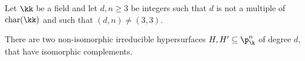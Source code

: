 \begin{maintheorem}\label{34and43}
Let $\kk$ be a field and let $d,n \ge 3$ be integers such that $d$ is not a multiple of $\mathrm{char}(\kk)$ and such that $(d,n)\neq (3,3)$.

There are two non-isomorphic irreducible hypersurfaces $H,H'\subseteq \p^n_\k$ of degree $d$, that have isomorphic complements.
\end{maintheorem}
